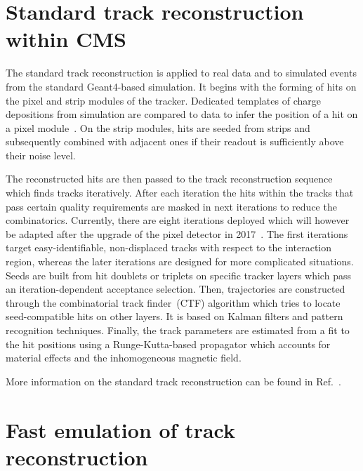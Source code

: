 \documentclass[a4paper]{jpconf}
\begin{document}
\section{Standard track reconstruction within CMS}
The standard track reconstruction is applied to real data and to simulated events from the standard Geant4-based simulation. It begins with the forming of hits on the pixel and strip modules of the tracker. Dedicated templates of charge depositions from simulation are compared to data to infer the position of a hit on a pixel module~\cite{pixelav}. On the strip modules, hits are seeded from strips and subsequently combined with adjacent ones if their readout is sufficiently above their noise level.

The reconstructed hits are then passed to the track reconstruction sequence which finds tracks iteratively. After each iteration the hits within the tracks that pass certain quality requirements are masked in next iterations to reduce the combinatorics. Currently, there are eight iterations deployed which will however be adapted after the upgrade of the pixel detector in 2017~\cite{pixelphase1}. The first iterations target easy-identifiable, non-displaced tracks with respect to the interaction region, whereas the later iterations are designed for more complicated situations. Seeds are built from hit doublets or triplets on specific tracker layers which pass an iteration-dependent acceptance selection. Then, trajectories are constructed through the combinatorial track finder~(CTF) algorithm which tries to locate seed-compatible hits on other layers. It is based on Kalman filters and pattern recognition techniques.  Finally, the track parameters are estimated from a fit to the hit positions using a Runge-Kutta-based propagator which accounts for material effects and the inhomogeneous magnetic field.

More information on the standard track reconstruction can be found in Ref.~\cite{trackreco}.


\section{Fast emulation of track reconstruction}
\end{document}
